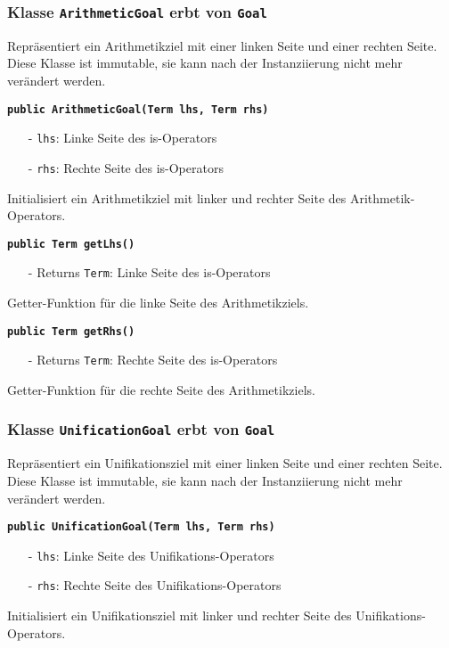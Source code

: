 \documentclass[parskip=full,11pt,twoside]{scrartcl}
\begin{document}
\subsubsection{Klasse \texttt{ArithmeticGoal} erbt von \texttt{Goal}}
Repräsentiert ein Arithmetikziel mit einer linken Seite und einer rechten Seite. Diese Klasse ist immutable, sie kann nach der Instanziierung nicht mehr verändert werden.

\textbf{\texttt{public ArithmeticGoal(Term lhs, Term rhs)}}
\begin{itemize}[noitemsep]
	\item[-] \texttt{lhs}: Linke Seite des is-Operators
	\item[-] \texttt{rhs}: Rechte Seite des is-Operators
\end{itemize}
Initialisiert ein Arithmetikziel mit linker und rechter Seite des Arithmetik-Operators.

\textbf{\texttt{public Term getLhs()}}
\begin{itemize}[noitemsep]
	\item[-] Returns \texttt{Term}: Linke Seite des is-Operators
\end{itemize}
Getter-Funktion für die linke Seite des Arithmetikziels.

\textbf{\texttt{public Term getRhs()}}
\begin{itemize}[noitemsep]
	\item[-] Returns \texttt{Term}: Rechte Seite des is-Operators
\end{itemize}
Getter-Funktion für die rechte Seite des Arithmetikziels.

\subsubsection{Klasse \texttt{UnificationGoal} erbt von \texttt{Goal}}
Repräsentiert ein Unifikationsziel mit einer linken Seite und einer rechten Seite. Diese Klasse ist immutable, sie kann nach der Instanziierung nicht mehr verändert werden.

\textbf{\texttt{public UnificationGoal(Term lhs, Term rhs)}}
\begin{itemize}[noitemsep]
	\item[-] \texttt{lhs}: Linke Seite des Unifikations-Operators
	\item[-] \texttt{rhs}: Rechte Seite des Unifikations-Operators
\end{itemize}
Initialisiert ein Unifikationsziel mit linker und rechter Seite des Unifikations-Operators.
\end{document}
